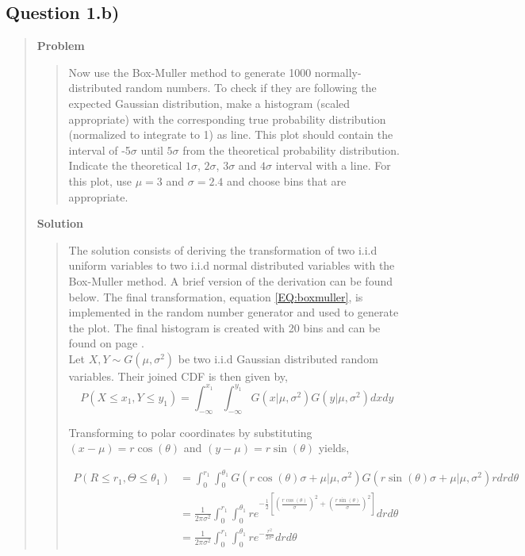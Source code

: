 
\subsection*{\textbf{Question 1.b)}}
\begin{quote}

\textbf{Problem}
\begin{quote}Now use the Box-Muller method to generate 1000 normally-distributed random numbers. To check if they are following the expected Gaussian distribution, make a histogram (scaled appropriate) with the corresponding true probability distribution (normalized to integrate to 1) as line. This plot should contain the interval of -5$\sigma$ until $5\sigma$ from the theoretical probability distribution. Indicate the theoretical $1\sigma$, $2\sigma$, $3\sigma$ and $4\sigma$ interval with a line. For this plot, use $\mu =3$ and $\sigma = 2.4$ and choose bins that are appropriate.
\end{quote}

\textbf{Solution} 



\begin{quote}
The solution consists of deriving the  transformation of two i.i.d uniform variables to two i.i.d normal distributed variables with the Box-Muller method. A brief version of the derivation can be found below. The final transformation, equation \ref{EQ:boxmuller}, is  implemented in the random number generator and used to generate the plot. The final histogram is created with 20 bins and can be found on page \pageref{fig:normal}.
\\


Let $X, Y \sim G(\mu, \sigma ^2)$ be two i.i.d Gaussian distributed random variables. Their joined CDF is then given by, 
\begin{equation}
P(X \leq x_1, Y \leq y_1) =  \int_{-\infty}^{x_1} \int_{-\infty}^{y_1} G(x| \mu, \sigma^2) G(y| \mu, \sigma^2) dx dy
\end{equation}

Transforming to polar coordinates by substituting $ (x-\mu) = r \cos(\theta)$ and $ (y-\mu) = r\sin(\theta)$ yields,

\begin{align*}
P(R \leq r_1, \Theta \leq \theta_1) &= \int_0^{r_1} \int_{0}^{\theta_1} G(r\cos(\theta) \sigma + \mu| \mu, \sigma^2) G(r\sin(\theta) \sigma + \mu| \mu, \sigma^2) r dr d\theta \\
&= \frac{1}{2 \pi \sigma^2} \int_0^{r_1} \int_{0}^{\theta_1} re^{ -\frac{1}{2} \left[ \left( \frac{r\cos(\theta)}{\sigma} \right)^2  + \left( \frac{r\sin(\theta)}{\sigma} \right)^2 \right]}  dr d\theta \\
&=  \frac{1}{2 \pi \sigma^2} \int_0^{r_1} \int_{0}^{\theta_1} re^{ -\frac{r^2}{2 \sigma ^2} } dr d\theta
\end{align*}


\end{quote}
\end{quote}
